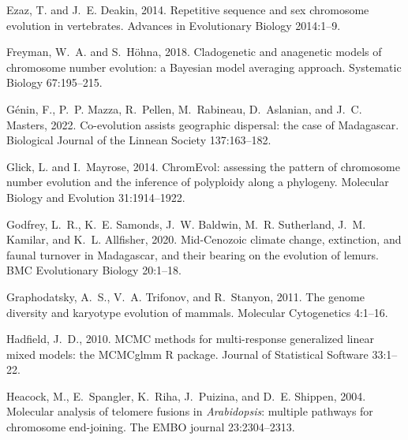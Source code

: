 \documentclass[a4paper, 12pt]{article}
\begin{document}
\begin{thebibliography}{73}
Ezaz, T. and J.~E. Deakin, 2014.
\newblock Repetitive sequence and sex chromosome evolution in vertebrates.
\newblock Advances in Evolutionary Biology 2014:1--9.

Freyman, W.~A. and S.~H{\"o}hna, 2018.
\newblock Cladogenetic and anagenetic models of chromosome number evolution: a
  {B}ayesian model averaging approach.
\newblock Systematic Biology 67:195--215.

G{\'e}nin, F., P.~P. Mazza, R.~Pellen, M.~Rabineau, D.~Aslanian, and J.~C.
  Masters, 2022.
\newblock Co-evolution assists geographic dispersal: the case of {M}adagascar.
\newblock Biological Journal of the Linnean Society 137:163--182.

Glick, L. and I.~Mayrose, 2014.
\newblock Chrom{E}vol: assessing the pattern of chromosome number evolution and
  the inference of polyploidy along a phylogeny.
\newblock Molecular Biology and Evolution 31:1914--1922.

Godfrey, L.~R., K.~E. Samonds, J.~W. Baldwin, M.~R. Sutherland, J.~M. Kamilar,
  and K.~L. Allfisher, 2020.
\newblock Mid-{C}enozoic climate change, extinction, and faunal turnover in
  {M}adagascar, and their bearing on the evolution of lemurs.
\newblock BMC Evolutionary Biology 20:1--18.

Graphodatsky, A.~S., V.~A. Trifonov, and R.~Stanyon, 2011.
\newblock The genome diversity and karyotype evolution of mammals.
\newblock Molecular Cytogenetics 4:1--16.

Hadfield, J.~D., 2010.
\newblock M{CMC} methods for multi-response generalized linear mixed models:
  the {MCMC}glmm {R} package.
\newblock Journal of Statistical Software 33:1--22.

Heacock, M., E.~Spangler, K.~Riha, J.~Puizina, and D.~E. Shippen, 2004.
\newblock Molecular analysis of telomere fusions in \textit{Arabidopsis}:
  multiple pathways for chromosome end-joining.
\newblock The EMBO journal 23:2304--2313.


\end{thebibliography}
\end{document}
